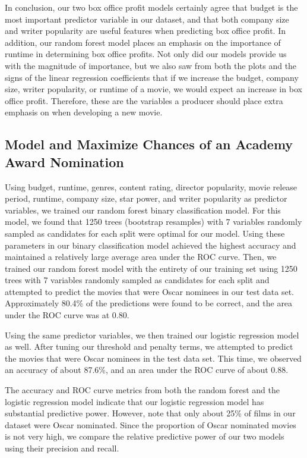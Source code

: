 \documentclass[10pt]{article}
\begin{document}
In conclusion, our two box office profit models certainly agree that budget is the most important predictor variable in our dataset, and that both company size and writer popularity are useful features when predicting box office profit. In addition, our random forest model places an emphasis on the importance of runtime in determining box office profits. Not only did our models provide us with the magnitude of importance, but we also saw from both the plots and the signs of the linear regression coefficients that if we increase the budget, company size, writer popularity, or runtime of a movie, we would expect an increase in box office profit. Therefore, these are the variables a producer should place extra emphasis on when developing a new movie. 

\subsection{Model and Maximize Chances of an Academy Award Nomination}

Using budget, runtime, genres, content rating, director popularity, movie release period, runtime, company size, star power, and writer popularity as predictor variables, we trained our random forest binary classification model. For this model, we found that 1250 trees (bootstrap resamples) with 7 variables randomly sampled as candidates for each split were optimal for our model. Using these parameters in our binary classification model achieved the highest accuracy and maintained a relatively large average area under the ROC curve. Then, we trained our random forest model with the entirety of our training set using 1250 trees with 7 variables randomly sampled as candidates for each split and attempted to predict the movies that were Oscar nominees in our test data set. Approximately 80.4\% of the predictions were found to be correct, and the area under the ROC curve was at 0.80. 

Using the same predictor variables, we then trained our logistic regression model as well. After tuning our threshold and penalty terms, we attempted to predict the movies that were Oscar nominees in the test data set. This time, we observed an accuracy of about 87.6\%, and an area under the ROC curve of about 0.88.

The accuracy and ROC curve metrics from both the random forest and the logistic regression model indicate that our logistic regression model has substantial predictive power. However, note that only about 25\% of films in our dataset were Oscar nominated. Since the proportion of Oscar nominated movies is not very high, we compare the relative predictive power of our two models using their precision and recall. 
\end{document}
